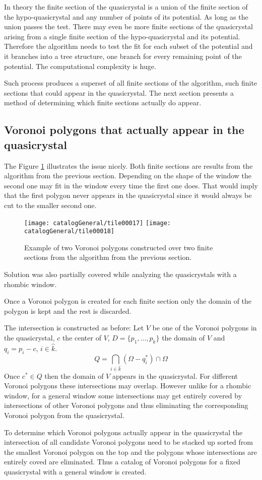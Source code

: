 \documentclass[text.tex]{subfiles}
\begin{document}
In theory the finite section of the quasicrystal is a union of the finite section of the hypo-quasicrystal and any number of points of its potential. As long as the union passes the test. There may even be more finite sections of the quasicrystal arising from a single finite section of the hypo-quasicrystal and its potential. Therefore the algorithm needs to test the fit for each subset of the potential and it branches into a tree structure, one branch for every remaining point of the potential. The computational complexity is huge. 

Such process produces a superset of all finite sections of the algorithm, such finite sections that could appear in the quasicrystal. The next section presents a method of determining which finite sections actually do appear. 

\subsection{Voronoi polygons that actually appear in the quasicrystal}
The Figure \ref{fig:twoTiles} illustrates the issue nicely. Both finite sections are results from the algorithm from the previous section. Depending on the shape of the window the second one may fit in the window every time the first one does. That would imply that the first polygon never appears in the quasicrystal since it would always be cut to the smaller second one. 
\begin{figure}[h!]
\centering
\texttt{[image: catalogGeneral/tile00017]}%
\qquad%
\texttt{[image: catalogGeneral/tile00018]}
\caption{Example of two Voronoi polygons constructed over two finite sections from the algorithm from the previous section.}
\label{fig:twoTiles}
\end{figure}

Solution was also partially covered while analyzing the quasicrystals with a rhombic window. 

Once a Voronoi polygon is created for each finite section only the domain of the polygon is kept and the rest is discarded. 

The intersection is constructed as before:
Let $V$ be one of the Voronoi polygons in the quasicrystal, $c$ the center of $V$, $D = \{p_1,\dots,p_k\}$ the domain of $V$ and $q_i = p_i - c$, $i\in\hat{k}$.
$$Q = \bigcap\limits_{i\in\hat{k}}(\Omega-q_i^\ast)\cap\Omega$$
Once $c^\ast\in Q$ then the domain of $V$ appears in the quasicrystal. For different Voronoi polygons these intersections may overlap. However unlike for a rhombic window, for a general window some intersections may get entirely covered by intersections of other Voronoi polygons and thus eliminating the corresponding Voronoi polygon from the quasicrystal. 

To determine which Voronoi polygons actually appear in the quasicrystal the intersection of all candidate Voronoi polygons need to be stacked up sorted from the smallest Voronoi polygon on the top and the polygons whose intersections are entirely coved are eliminated. Thus a catalog of Voronoi polygons for a fixed quasicrystal with a general window is created. 
\end{document}
